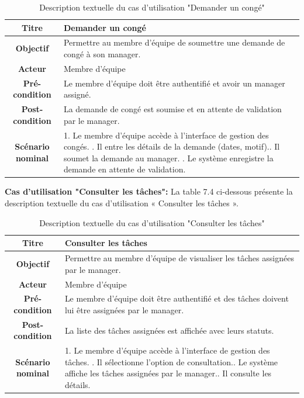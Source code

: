  \begin{table}[H]
 \caption{ Description textuelle du cas d’utilisation "Demander un congé"}
    \centering
    \begin{tabular}{|c|p{12cm}|}
    \hline
    \textbf{Titre} & Demander un congé \\
    \hline
    \textbf{Objectif} & Permettre au membre d’équipe de soumettre une demande de congé à son manager. \\
    \hline
    \textbf{Acteur}& Membre d’équipe\\
    \hline
    \textbf{Pré-condition} & Le membre d’équipe doit être authentifié et avoir un manager assigné.\\
    \hline
    \textbf{Post-condition} & La demande de congé est soumise et en attente de validation par le manager.\\
    \hline
    \textbf{Scénario nominal} & 1. Le membre d’équipe accède à l’interface de gestion des congés. \newline
    2. Il entre les détails de la demande (dates, motif).\newline
    3. Il soumet la demande au manager.
    \newline
    4. Le système enregistre la demande en attente de validation.
    \\
    \hline
    \end{tabular}
    \label{tab:user_stories}
\end{table}

     \item \textbf{Cas d'utilisation "Consulter les tâches": } La table 7.4 ci-dessous présente la description textuelle du cas d'utilisation « Consulter les tâches ».

 \begin{table}[H]
 \caption{ Description textuelle du cas d’utilisation "Consulter les tâches"}
    \centering
    \begin{tabular}{|c|p{12cm}|}
    \hline
    \textbf{Titre} & Consulter les tâches \\
    \hline
    \textbf{Objectif} & Permettre au membre d’équipe de visualiser les tâches assignées par le manager. \\
    \hline
    \textbf{Acteur}& Membre d’équipe\\
    \hline
    \textbf{Pré-condition} & Le membre d’équipe doit être authentifié et des tâches doivent lui être assignées par le manager.
    \\
    \hline
    \textbf{Post-condition} & La liste des tâches assignées est affichée avec leurs statuts.\\
    \hline
    \textbf{Scénario nominal} & 1. Le membre d’équipe accède à l’interface de gestion des tâches. \newline
    2. Il sélectionne l’option de consultation.\newline
    3. Le système affiche les tâches assignées par le manager.\newline
    4. Il consulte les détails.\\
    \hline
    \end{tabular}
    \label{tab:user_stories}
\end{table}


